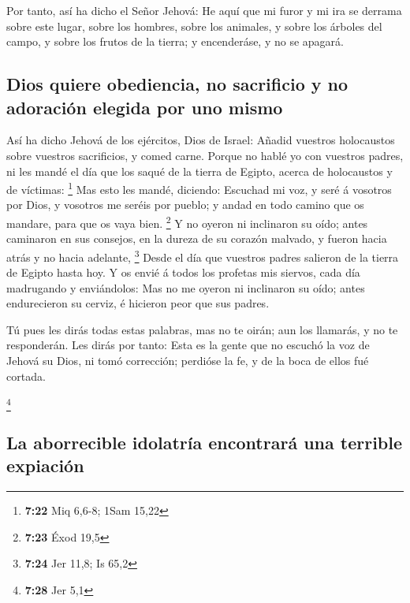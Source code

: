  Por tanto, así ha dicho el Señor Jehová: He aquí que mi
furor y mi ira se derrama sobre este lugar, sobre los hombres, sobre los
animales, y sobre los árboles del campo, y sobre los frutos de la
tierra; y encenderáse, y no se apagará.

\hypertarget{dios-quiere-obediencia-no-sacrificio-y-no-adoraciuxf3n-elegida-por-uno-mismo}{%
\subsection{Dios quiere obediencia, no sacrificio y no adoración elegida
por uno
mismo}\label{dios-quiere-obediencia-no-sacrificio-y-no-adoraciuxf3n-elegida-por-uno-mismo}}

 Así ha dicho Jehová de los ejércitos, Dios de Israel:
Añadid vuestros holocaustos sobre vuestros sacrificios, y comed carne.
 Porque no hablé yo con vuestros padres, ni les mandé el
día que los saqué de la tierra de Egipto, acerca de holocaustos y de
víctimas: \footnote{\textbf{7:22} Miq 6,6-8; 1Sam 15,22} 
Mas esto les mandé, diciendo: Escuchad mi voz, y seré á vosotros por
Dios, y vosotros me seréis por pueblo; y andad en todo camino que os
mandare, para que os vaya bien. \footnote{\textbf{7:23} Éxod 19,5}
 Y no oyeron ni inclinaron su oído; antes caminaron en
sus consejos, en la dureza de su corazón malvado, y fueron hacia atrás y
no hacia adelante, \footnote{\textbf{7:24} Jer 11,8; Is 65,2}
 Desde el día que vuestros padres salieron de la tierra
de Egipto hasta hoy. Y os envié á todos los profetas mis siervos, cada
día madrugando y enviándolos:  Mas no me oyeron ni
inclinaron su oído; antes endurecieron su cerviz, é hicieron peor que
sus padres.

 Tú pues les dirás todas estas palabras, mas no te oirán;
aun los llamarás, y no te responderán.  Les dirás por
tanto: Esta es la gente que no escuchó la voz de Jehová su Dios, ni tomó
corrección; perdióse la fe, y de la boca de ellos fué cortada.

\footnote{\textbf{7:28} Jer 5,1}

\hypertarget{la-aborrecible-idolatruxeda-encontraruxe1-una-terrible-expiaciuxf3n}{%
\subsection{La aborrecible idolatría encontrará una terrible
expiación}\label{la-aborrecible-idolatruxeda-encontraruxe1-una-terrible-expiaciuxf3n}}

